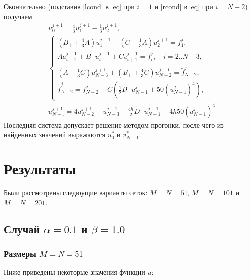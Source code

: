 \documentclass[a4paper,12pt]{article}
\begin{document}
Окончательно (подставив \cref{lcond} в \cref{eq} при \(i=1\) и \cref{rcond} в \cref{eq} при \(i=N-2\)) получаем
\begin{align*}
   & u_{0}^{j+1} = \frac{4}{3}u_{1}^{j+1} - \frac{1}{3} u_{2}^{j+1},                                                                         \\
   & \begin{cases}
       \left(B_{+} + \frac{4}{3}A\right) u_{1}^{j+1} + \left(C - \frac{1}{3}A\right) u_{2}^{j+1} = f_{1}^{j},               \\
       A u_{i-1}^{j+1} + B_{+} u_{i}^{j+1} + C u_{i+1}^{j+1} =  f_{i}^{j}, \quad i=2..N-3,                                  \\
       \left(A - \frac{1}{3}C\right) u_{N-3}^{j+1} + \left(B_{+} + \frac{4}{3}C\right) u_{N-2}^{j+1} = \tilde{f}_{N-2}^{j}, \\
       \tilde{f}_{N-2}^{j} = f_{N-2}^{j} - C\left(\frac{1}{2}\tilde{D}_{-}u_{N-1}^{j} + 50\left(u_{N-1}^{j}\right)^4\right),
     \end{cases} \\
   & u_{N-1}^{j+1}= 4u_{N-2}^{j+1} - u_{N-3}^{j+1}-\frac{4h}{2}\tilde{D}_{-}u_{N-1}^{j+1} + 4h50\left(u_{N-1}^{j}\right)^4 
\end{align*}
Последняя система допускает решение методом прогонки, после чего из найденных значений выражаются \(u_{0}^{*}\) и \(u_{N-1}^{*}\).
\section*{Результаты}
Были рассмотрены следюущие варианты сеток: \(M=N=51\), \(M=N=101\) и \(M=N=201\).

\subsection*{Случай \(\alpha=0.1\) и \(\beta=1.0\)}

\subsubsection*{Размеры \(M=N=51\)}

Ниже приведены некоторые значения функции \(u\):
\end{document}
